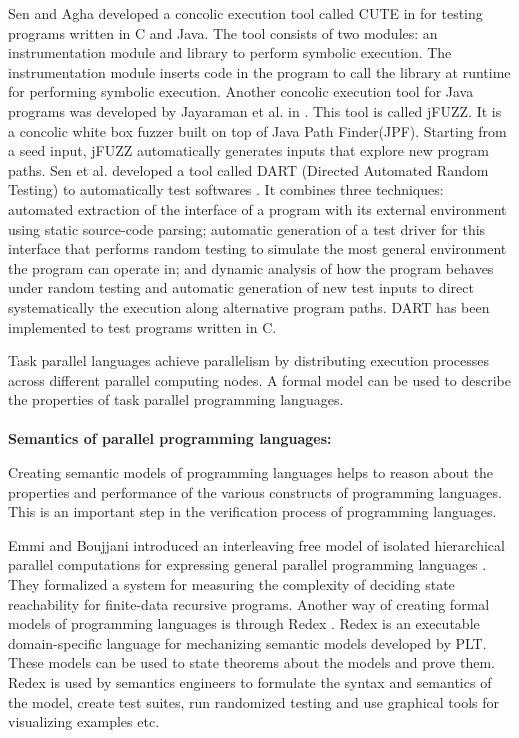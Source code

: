 Sen and Agha developed a concolic execution tool called CUTE in \cite{sen2006cute} for testing programs written in C and Java. The tool consists of two modules: an instrumentation module and library to perform symbolic execution. The instrumentation module inserts code in the program to call the library at runtime for performing symbolic execution. Another concolic execution tool for Java programs was developed by Jayaraman et al. in \cite{jayaraman2009jfuzz}. This tool is called jFUZZ. It is a concolic white box fuzzer built on top of Java Path Finder(JPF). Starting from a seed input, jFUZZ automatically generates inputs that explore new program paths. Sen et al. developed a tool called DART (Directed Automated Random Testing) to automatically test softwares \cite{godefroid2005dart} . It combines three techniques: automated extraction of the interface of a program with its external environment using static source-code parsing; automatic generation of a test driver for this interface that performs random testing to simulate the most general environment the program can operate in; and dynamic analysis of how the program behaves under random testing and automatic generation of new test inputs to direct systematically the execution along alternative program paths. DART has been implemented to test programs written in C.

Task parallel languages achieve parallelism by distributing execution processes across different parallel computing nodes. A formal model can be used to describe the properties of task parallel programming languages. 
\\
\\
\textbf{Semantics of parallel programming languages:} 

Creating semantic models of programming languages helps to reason about the properties and performance of the various constructs of programming languages. This is an important step in the verification process of programming languages.

Emmi and Boujjani introduced an interleaving free model of isolated hierarchical parallel computations for expressing general parallel programming languages \cite{bouajjani2012analysis}. They formalized a system for measuring the complexity of deciding state reachability for finite-data recursive programs. Another way of creating formal models of programming languages is through Redex \cite{klein2012run}. Redex is an executable domain-specific language for mechanizing semantic models developed by PLT. These models can be used to state theorems about the models and prove them. Redex is used by semantics engineers to formulate the syntax and semantics of the model, create test suites, run randomized testing and use graphical tools for visualizing examples etc.

